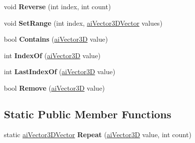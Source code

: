 \begin{DoxyCompactItemize}
\item 
\hypertarget{classai_vector3_d_vector_aac23c001d7de5f00c5ddca66803d427d}{void {\bfseries Reverse} (int index, int count)}\label{classai_vector3_d_vector_aac23c001d7de5f00c5ddca66803d427d}

\item 
\hypertarget{classai_vector3_d_vector_a7101cefb9ac98bb43fd3b06ff4afc7ce}{void {\bfseries Set\+Range} (int index, \hyperlink{classai_vector3_d_vector}{ai\+Vector3\+D\+Vector} values)}\label{classai_vector3_d_vector_a7101cefb9ac98bb43fd3b06ff4afc7ce}

\item 
\hypertarget{classai_vector3_d_vector_ae9e9be370f0e7e6eb06a26a102bfc9c3}{bool {\bfseries Contains} (\hyperlink{structai_vector3_d}{ai\+Vector3\+D} value)}\label{classai_vector3_d_vector_ae9e9be370f0e7e6eb06a26a102bfc9c3}

\item 
\hypertarget{classai_vector3_d_vector_a26061e0ddb7775f6fa5e9f85f8bba303}{int {\bfseries Index\+Of} (\hyperlink{structai_vector3_d}{ai\+Vector3\+D} value)}\label{classai_vector3_d_vector_a26061e0ddb7775f6fa5e9f85f8bba303}

\item 
\hypertarget{classai_vector3_d_vector_ac63df71b5b3db9873605d48af12d6d74}{int {\bfseries Last\+Index\+Of} (\hyperlink{structai_vector3_d}{ai\+Vector3\+D} value)}\label{classai_vector3_d_vector_ac63df71b5b3db9873605d48af12d6d74}

\item 
\hypertarget{classai_vector3_d_vector_a9a1fbf2af1efe22a8fec354fe40b3ebb}{bool {\bfseries Remove} (\hyperlink{structai_vector3_d}{ai\+Vector3\+D} value)}\label{classai_vector3_d_vector_a9a1fbf2af1efe22a8fec354fe40b3ebb}

\end{DoxyCompactItemize}
\subsection*{Static Public Member Functions}
\begin{DoxyCompactItemize}
\item 
\hypertarget{classai_vector3_d_vector_acc561a3b612288dd10a224e34ec7669a}{static \hyperlink{classai_vector3_d_vector}{ai\+Vector3\+D\+Vector} {\bfseries Repeat} (\hyperlink{structai_vector3_d}{ai\+Vector3\+D} value, int count)}\label{classai_vector3_d_vector_acc561a3b612288dd10a224e34ec7669a}

\end{DoxyCompactItemize}
